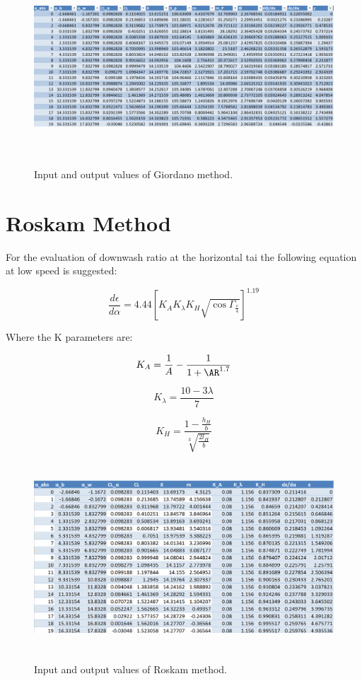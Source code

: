 \begin{figure}[H]
\centering
{\includegraphics[height=6.6cm]{immagini/giord1.png}} 
\caption{Input and output values of Giordano method.}
\label{giordanodata2}
\end{figure} 


\section{Roskam Method}
For the evaluation of downwash ratio at the horizontal tai the following equation at low speed is suggested:

\begin{equation} 
\frac{d\epsilon}{d\alpha} = 4.44 {\left[ K_A K_{\lambda} K_H \sqrt{\cos{ \Gamma_{\frac{c}{4}}}}  \right]}^{1.19}
\end{equation}

Where the K parameters are:

\begin{equation}
K_A = \frac{1}{A} - \frac{1}{1+\AR^{1.7}}
\end{equation}

\begin{equation}
K_{\lambda} = \frac{10 - 3 \lambda}{7}
\end{equation}

\begin{equation}
K_H = \frac{1- \frac{h_H}{b}}{\sqrt[3]{\frac{2 l_H}{b}}}
\end{equation}
\begin{figure}[H]
\centering
{\includegraphics[height=7cm]{immagini/roskam1}} 
\caption{Input and output values of Roskam method.}
\label{roskamdata}
\end{figure} 

